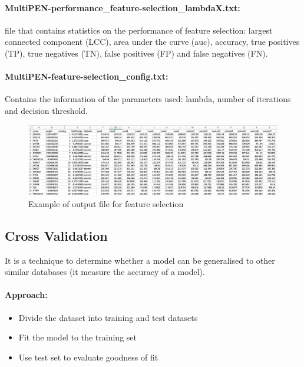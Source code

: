 \documentclass[11pt, oneside]{article}   	%
\begin{document}
\paragraph{MultiPEN-performance\_feature-selection\_lambdaX.txt:} file that contains statistics on the performance of feature selection: largest connected component (LCC), area under the curve (auc), accuracy, true positives (TP), true negatives (TN), false positives (FP) and false negatives (FN).

\paragraph{MultiPEN-feature-selection\_config.txt:} Contains the information of the parameters used: lambda, number of iterations and decision threshold.



\begin{figure}[!ht]
	\centering
	\includegraphics[width=\textwidth]{example_output_rankings}
	\caption{Example of output file for feature selection}
	\label{fig:example_output_rankings}
\end{figure}



\subsection{Cross Validation}

It is a technique to determine whether a model can be generalised to other similar databases (it measure the accuracy of a model).

\paragraph{Approach:}


\begin{itemize}

   \item Divide the dataset into training and test datasets
   
   \item Fit the model to the training set
   
   \item Use test set to evaluate goodness of fit
   
\end{itemize}
\end{document}
